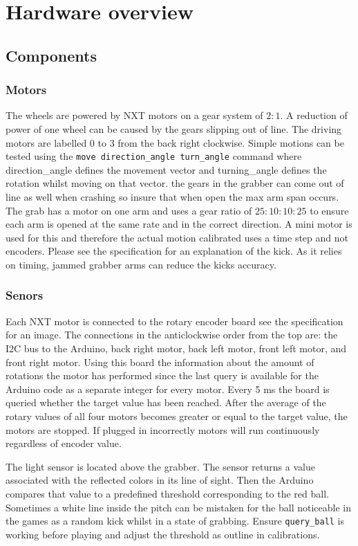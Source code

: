 \documentclass[a4paper,12pt]{article}
\begin{document}
\section{Hardware overview}

\subsection{Components}
\subsubsection{Motors}
The wheels are powered by NXT motors on a gear system of $2:1$. A reduction of power of one wheel can be caused by the gears slipping out of line. The driving motors are labelled 0 to 3 from the back right clockwise. Simple motions can be tested using the \texttt{move direction\_angle turn\_angle} command where direction\_angle defines the movement vector and turning\_angle defines the rotation whilst moving on that vector. the gears in the grabber can come out of line as well when crashing so insure that when open the max arm span occurs. The grab has a motor on one arm and uses a gear ratio of $25:10:10:25$ to ensure each arm is opened at the same rate and in the correct direction. A mini motor is used for this and therefore the actual motion calibrated uses a time step and not encoders. Please see the specification for an explanation of the kick. As it relies on timing, jammed grabber arms can reduce the kicks accuracy.

\subsubsection{Senors}

Each NXT motor is connected to the rotary encoder board see the specification for an image. The connections in the anticlockwise order from the top are: the I2C bus to the Arduino, back right motor, back left motor, front left motor, and front right motor. Using this board the information about the amount of rotations the motor has performed since the last query is available for the Arduino code as a separate integer for every motor. Every 5 ms the board is queried whether the target value has been reached. After the average of the rotary values of all four motors becomes greater or equal to the target value, the motors are stopped. If plugged in incorrectly motors will run continuously regardless of encoder value.

The light sensor is located above the grabber. The sensor returns a value associated with the reflected colors in its line of sight. Then the Arduino compares that value to a predefined threshold corresponding to the red ball. Sometimes a white line inside the pitch can be mistaken for the ball noticeable in the games as a random kick whilst in a state of grabbing. Ensure \texttt{query\_ball} is working before playing and adjust the threshold as outline in calibrations.
\end{document}
